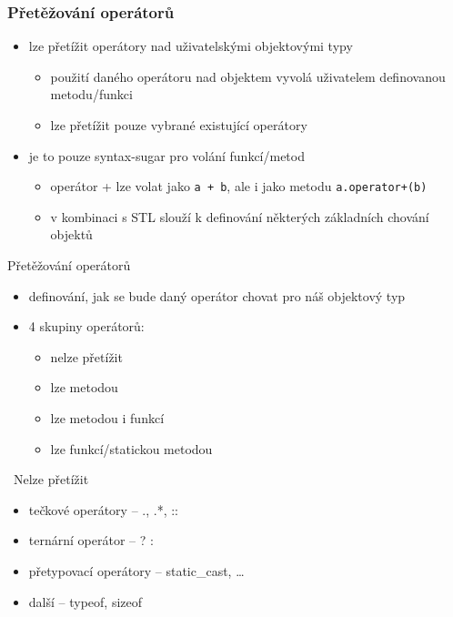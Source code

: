 \nezkouskove
{}


\begin{frame}[fragile]
\frametitle{Přetěžování operátorů}
\begin{block}{}
\begin{itemize}
\item lze přetížit operátory nad uživatelskými objektovými typy
\begin{itemize}
\item použití daného operátoru nad objektem vyvolá uživatelem definovanou metodu/funkci
\item lze přetížit pouze vybrané existující operátory
\end{itemize}
\item je to pouze syntax-sugar pro volání funkcí/metod
\begin{itemize}
\item operátor + lze volat jako \lstinline|a + b|, ale i jako metodu \lstinline|a.operator+(b)|
\item v kombinaci s STL slouží k definování některých základních chování objektů
\end{itemize}
\end{itemize}
\end{block}
\end{frame}

\begin{frame}[fragile]
\begin{block}{Přetěžování operátorů} 
\begin{itemize}
\item definování, jak se bude daný operátor chovat pro náš objektový typ
\item 4 skupiny operátorů:
\begin{itemize}
\item nelze přetížit
\item lze metodou
\item lze metodou i funkcí
\item lze funkcí/statickou metodou
\end{itemize}
\end{itemize}
\end{block}
\end{frame}



\begin{frame}[fragile]
\begin{alertblock}{{\NO}~Nelze přetížit}

\begin{itemize}
\item tečkové operátory -- ., .*, ::
\item ternární operátor -- ? :
\item přetypovací operátory -- static\_cast, \ldots
\item další -- typeof, sizeof
\end{itemize}
\end{alertblock}
\end{frame}







